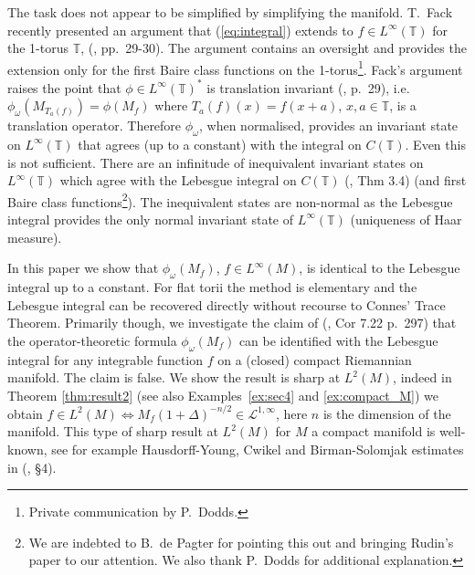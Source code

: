 \documentclass[final,1p]{elsarticle}
\numberwithin{equation}{section}
\theoremstyle{plain}
\theoremstyle{definition}
\begin{document}
The task does not appear to be simplified by simplifying the manifold.  T.~Fack recently presented an argument that (\ref{eq:integral}) extends to $f \in L^\infty({\ensuremath{\mathbb{T}}})$ for the 1-torus ${\ensuremath{\mathbb{T}}}$, (\cite{Fack}, pp.~29-30).  The argument contains an oversight and provides the extension only for the first Baire class functions on the 1-torus\footnote{Private communication by P.~Dodds.}.
Fack's argument raises the point that $\phi \in L^\infty({\ensuremath{\mathbb{T}}})^*$ is translation invariant (\cite{Fack}, p.~29), i.e. $\phi_\omega(M_{T_a(f)}) = \phi(M_{f})$ where $T_a(f)(x) = f(x+a)$, $x,a \in {\ensuremath{\mathbb{T}}}$, is a translation operator.
Therefore $\phi_\omega$, when normalised, provides an invariant state on $L^\infty({\ensuremath{\mathbb{T}}})$ that agrees (up to a constant) with the integral on $C({\ensuremath{\mathbb{T}}})$.  Even this is not sufficient.  There are an infinitude of inequivalent invariant states on $L^\infty({\ensuremath{\mathbb{T}}})$ which agree with the Lebesgue integral on $C({\ensuremath{\mathbb{T}}})$ (\cite{Rudin}, Thm 3.4) (and first Baire class functions\footnote{We are indebted to B.~de Pagter for pointing this out and bringing Rudin's paper to our attention.  We also thank P.~Dodds for additional explanation.}).  The inequivalent states are non-normal
as the Lebesgue integral provides the only normal invariant state of $L^\infty({\ensuremath{\mathbb{T}}})$
(uniqueness of Haar measure).

\medskip In this paper we show that $\phi_\omega(M_f)$, $f \in L^\infty(M)$, is identical to the Lebesgue integral up to a constant. For flat torii the method is elementary
and the Lebesgue integral can be recovered directly without recourse to Connes' Trace Theorem.  Primarily though, we investigate the claim of (\cite{GBVF}, Cor 7.22 p.~297) that the operator-theoretic formula $\phi_\omega(M_f)$ can be identified with the Lebesgue integral for any integrable function $f$ on a (closed) compact Riemannian manifold.  The claim is false.
We show the result is sharp at $L^2(M)$, indeed in Theorem \ref{thm:result2} (see also Examples~\ref{ex:sec4} and \ref{ex:compact_M})
we obtain $f \in L^2(M) \Leftrightarrow M_f(1+\Delta)^{-n/2} \in \mathcal{L}^{1,\infty}$, here $n$ is the dimension of the manifold. This type of sharp result at $L^2(M)$ for $M$ a compact manifold is
well-known, see for example Hausdorff-Young, Cwikel and Birman-Solomjak estimates in (\cite{S}, \S 4).
\end{document}
